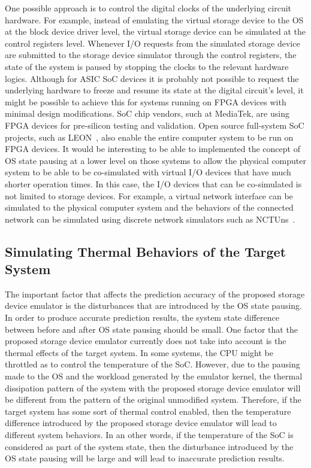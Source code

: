 One possible approach is to control the digital clocks of the underlying circuit hardware. For example, instead of emulating the virtual storage device to the OS at the block device driver level, the virtual storage device can be simulated at the control registers level. Whenever I/O requests from the simulated storage device are submitted to the storage device simulator through the control registers, the state of the system is paused by stopping the clocks to the relevant hardware logics. Although for ASIC SoC devices it is probably not possible to request the underlying hardware to freeze and resume its state at the digital circuit's level, it might be possible to achieve this for systems running on FPGA devices with minimal design modifications. SoC chip vendors, such at MediaTek, are using FPGA devices for pre-silicon testing and validation. Open source full-system SoC projects, such as LEON~\cite{wiki:LEON}, also enable the entire computer system to be run on FPGA devices. It would be interesting to be able to implemented the concept of OS state pausing at a lower level on those systems to allow the physical computer system to be able to be co-simulated with virtual I/O devices that have much shorter operation times. In this case, the I/O devices that can be co-simulated is not limited to storage devices. For example, a virtual network interface can be simulated to the physical computer system and the behaviors of the connected network can be simulated using discrete network simulators such as NCTUns~\cite{Wang:2007}.

\subsection{Simulating Thermal Behaviors of the Target System}

The important factor that affects the prediction accuracy of the proposed storage device emulator is the disturbances that are introduced by the OS state pausing. In order to produce accurate prediction results, the system state difference between before and after OS state pausing should be small. One factor that the proposed storage device emulator currently does not take into account is the thermal effects of the target system. In some systems, the CPU might be throttled as to control the temperature of the SoC. However, due to the pausing made to the OS and the workload generated by the emulator kernel, the thermal dissipation pattern of the system with the proposed storage device emulator will be different from the pattern of the original unmodified system. Therefore, if the target system has some sort of thermal control enabled, then the temperature difference introduced by the proposed storage device emulator will lead to different system behaviors. In an other words, if the temperature of the SoC is considered as part of the system state, then the disturbance introduced by the OS state pausing will be large and will lead to inaccurate prediction results.

